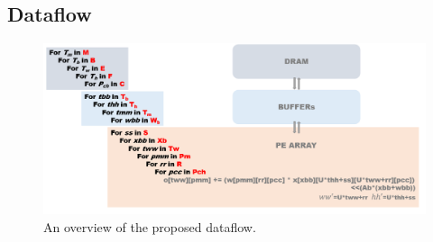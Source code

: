 \subsection{Dataflow}
\begin{figure}[h]
    \centering
    \includegraphics[width=1\linewidth]{inc/4_proposed_architecture/figure/dataflow.png}
    \caption{An overview of the proposed dataflow.}
    \label{fig:dataflow}
\end{figure}

